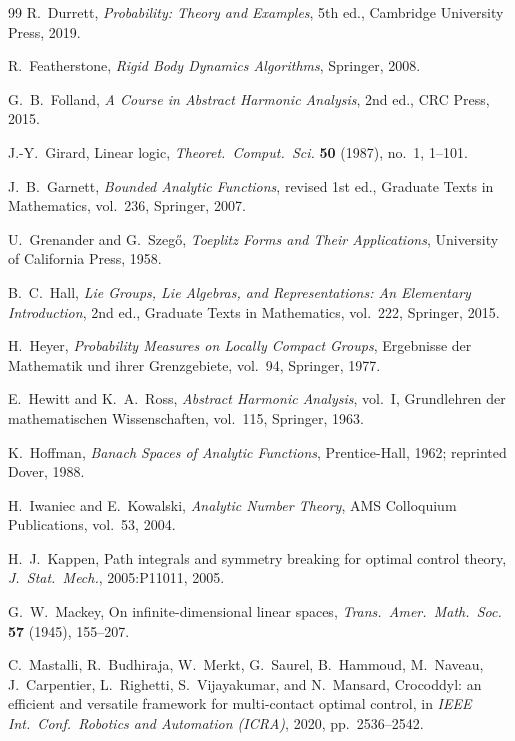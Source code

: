 \begin{thebibliography}{99}
R.~Durrett,
\emph{Probability: Theory and Examples}, 5th ed.,
Cambridge University Press, 2019.

R.~Featherstone,
\emph{Rigid Body Dynamics Algorithms},
Springer, 2008.

G.~B.~Folland,
\emph{A Course in Abstract Harmonic Analysis}, 2nd ed.,
CRC Press, 2015.

J.-Y.~Girard,
Linear logic,
\emph{Theoret.\ Comput.\ Sci.} \textbf{50} (1987), no.~1, 1--101.

J.~B.~Garnett,
\emph{Bounded Analytic Functions}, revised 1st ed.,
Graduate Texts in Mathematics, vol.~236, Springer, 2007.

U.~Grenander and G.~Szeg\H{o},
\emph{Toeplitz Forms and Their Applications},
University of California Press, 1958.

B.~C.~Hall,
\emph{Lie Groups, Lie Algebras, and Representations: An Elementary Introduction}, 2nd ed.,
Graduate Texts in Mathematics, vol.~222, Springer, 2015.

H.~Heyer,
\emph{Probability Measures on Locally Compact Groups},
Ergebnisse der Mathematik und ihrer Grenzgebiete, vol.~94, Springer, 1977.

E.~Hewitt and K.~A.~Ross,
\emph{Abstract Harmonic Analysis}, vol.~I,
Grundlehren der mathematischen Wissenschaften, vol.~115, Springer, 1963.

K.~Hoffman,
\emph{Banach Spaces of Analytic Functions},
Prentice-Hall, 1962; reprinted Dover, 1988.

H.~Iwaniec and E.~Kowalski,
\emph{Analytic Number Theory},
AMS Colloquium Publications, vol.~53, 2004.

H.~J.~Kappen,
Path integrals and symmetry breaking for optimal control theory,
\emph{J.\ Stat.\ Mech.}, 2005:P11011, 2005.

G.~W.~Mackey,
On infinite-dimensional linear spaces,
\emph{Trans.\ Amer.\ Math.\ Soc.} \textbf{57} (1945), 155--207.

C.~Mastalli, R.~Budhiraja, W.~Merkt, G.~Saurel, B.~Hammoud,
M.~Naveau, J.~Carpentier, L.~Righetti, S.~Vijayakumar, and N.~Mansard,
Crocoddyl: an efficient and versatile framework for multi-contact
optimal control,
in \emph{IEEE Int.\ Conf.\ Robotics and Automation (ICRA)}, 2020,
pp.~2536--2542.


\end{thebibliography}
